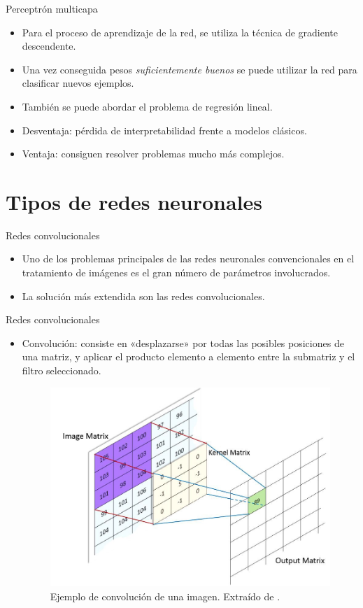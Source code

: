 \documentclass[spanish]{beamer}
\begin{document}
\begin{frame}{Perceptrón multicapa}
  \begin{itemize}
    \item Para el proceso de aprendizaje de la red, se utiliza la técnica de gradiente descendente.
    \item Una vez conseguida pesos \textit{suficientemente buenos} se puede utilizar la red para clasificar nuevos ejemplos.
    \item También se puede abordar el problema de regresión lineal.
    \item Desventaja: pérdida de interpretabilidad frente a modelos clásicos.
    \item Ventaja: consiguen resolver problemas mucho más complejos.
  \end{itemize}
\end{frame}

\section{Tipos de redes neuronales}

\begin{frame}{Redes convolucionales}
    \begin{itemize}
        \item Uno de los problemas principales de las redes neuronales convencionales en el tratamiento de imágenes es el gran número de parámetros involucrados.
        \item La solución más extendida son las redes convolucionales.
    \end{itemize}
\end{frame}

\begin{frame}{Redes convolucionales}
  \begin{itemize}
    \item Convolución: consiste en «desplazarse» por todas las posibles posiciones de una matriz, y aplicar el producto elemento a elemento entre la submatriz y el filtro seleccionado.
\vspace{1em}
\begin{figure}[h]
    \centering
    \includegraphics[width=0.5\linewidth]{img/conv.jpeg}
    \caption{Ejemplo de convolución de una imagen. Extraído de \parencite{machine_image_2017}.}%
    \label{fig:conv}
\end{figure}
  \end{itemize}
\end{frame}
\end{document}
